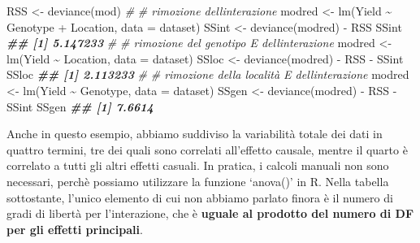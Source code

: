\documentclass[
  12pt,
]{book}
\newenvironment{Shaded}{\begin{snugshade}}{\end{snugshade}}
\newcommand{\AttributeTok}[1]{\textcolor[rgb]{0.77,0.63,0.00}{#1}}
\newcommand{\CommentTok}[1]{\textcolor[rgb]{0.56,0.35,0.01}{\textit{#1}}}
\newcommand{\DocumentationTok}[1]{\textcolor[rgb]{0.56,0.35,0.01}{\textbf{\textit{#1}}}}
\newcommand{\FunctionTok}[1]{\textcolor[rgb]{0.00,0.00,0.00}{#1}}
\newcommand{\NormalTok}[1]{#1}
\newcommand{\OtherTok}[1]{\textcolor[rgb]{0.56,0.35,0.01}{#1}}
\newcommand{\SpecialCharTok}[1]{\textcolor[rgb]{0.00,0.00,0.00}{#1}}
\begin{document}
\begin{Shaded}
\begin{Highlighting}[]
\NormalTok{RSS }\OtherTok{\textless{}{-}} \FunctionTok{deviance}\NormalTok{(mod)}
\CommentTok{\#}
\CommentTok{\# rimozione dell\textquotesingle{}interazione}
\NormalTok{modred }\OtherTok{\textless{}{-}} \FunctionTok{lm}\NormalTok{(Yield }\SpecialCharTok{\textasciitilde{}}\NormalTok{ Genotype }\SpecialCharTok{+}\NormalTok{ Location, }\AttributeTok{data =}\NormalTok{ dataset)}
\NormalTok{SSint }\OtherTok{\textless{}{-}} \FunctionTok{deviance}\NormalTok{(modred) }\SpecialCharTok{{-}}\NormalTok{ RSS}
\NormalTok{SSint}
\DocumentationTok{\#\# [1] 5.147233}
\CommentTok{\#}
\CommentTok{\# rimozione del genotipo E dell\textquotesingle{}interazione}
\NormalTok{modred }\OtherTok{\textless{}{-}} \FunctionTok{lm}\NormalTok{(Yield }\SpecialCharTok{\textasciitilde{}}\NormalTok{ Location, }\AttributeTok{data =}\NormalTok{ dataset)}
\NormalTok{SSloc }\OtherTok{\textless{}{-}} \FunctionTok{deviance}\NormalTok{(modred) }\SpecialCharTok{{-}}\NormalTok{ RSS }\SpecialCharTok{{-}}\NormalTok{ SSint}
\NormalTok{SSloc}
\DocumentationTok{\#\# [1] 2.113233}
\CommentTok{\#}
\CommentTok{\# rimozione della località E dell\textquotesingle{}interazione}
\NormalTok{modred }\OtherTok{\textless{}{-}} \FunctionTok{lm}\NormalTok{(Yield }\SpecialCharTok{\textasciitilde{}}\NormalTok{ Genotype, }\AttributeTok{data =}\NormalTok{ dataset)}
\NormalTok{SSgen }\OtherTok{\textless{}{-}} \FunctionTok{deviance}\NormalTok{(modred) }\SpecialCharTok{{-}}\NormalTok{ RSS }\SpecialCharTok{{-}}\NormalTok{ SSint}
\NormalTok{SSgen}
\DocumentationTok{\#\# [1] 7.6614}
\end{Highlighting}
\end{Shaded}

Anche in questo esempio, abbiamo suddiviso la variabilità totale dei dati in quattro termini, tre dei quali sono correlati all'effetto causale, mentre il quarto è correlato a tutti gli altri effetti casuali. In pratica, i calcoli manuali non sono necessari, perchè possiamo utilizzare la funzione `anova()' in R. Nella tabella sottostante, l'unico elemento di cui non abbiamo parlato finora è il numero di gradi di libertà per l'interazione, che è \textbf{uguale al prodotto del numero di DF per gli effetti principali}.
\end{document}
